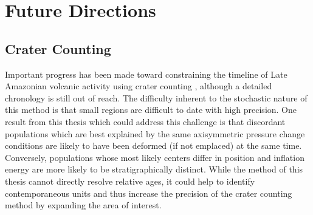 
\section{Future Directions}

\subsection{Crater Counting}
Important progress has been made toward constraining the timeline of Late Amazonian volcanic activity using crater counting \parencite{kneissl_map-projection-independent_2011,robbins_volcanic_2011,
robbins_large_2013,
platz_crater-based_2013}, although a detailed chronology is still out of reach. The difficulty inherent to the stochastic nature of this method is that small regions are difficult to date with high precision. One result from this thesis which could address this challenge is that discordant populations which are best explained by the same axisymmetric pressure change conditions are likely to have been deformed (if not emplaced) at the same time. Conversely, populations whose most likely centers differ in position and inflation energy are more likely to be stratigraphically distinct. While the method of this thesis cannot directly resolve relative ages, it could help to identify contemporaneous units and thus increase the precision of the crater counting method by expanding the area of interest.

